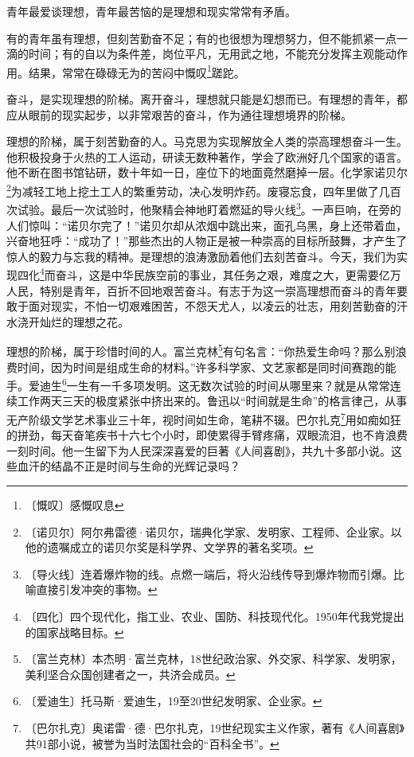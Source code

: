 \documentclass[12pt,UTF-8,openany]{ctexbook}
\begin{document}
\begin{large}
    
    青年最爱谈理想，青年最苦恼的是理想和现实常常有矛盾。
    
    有的青年虽有理想，但刻苦勤奋不足；有的也很想为理想努力，但不能抓紧一点一滴的时间；有的自以为条件差，岗位平凡，无用武之地，不能充分发挥主观能动作用。结果，常常在碌碌无为的苦闷中慨叹\footnote{〔慨叹〕感慨叹息}蹉跎。
    
    奋斗，是实现理想的阶梯。离开奋斗，理想就只能是幻想而已。有理想的青年，都应从眼前的现实起步，以非常艰苦的奋斗，作为通往理想境界的阶梯。
    
    理想的阶梯，属于刻苦勤奋的人。马克思为实现解放全人类的崇高理想奋斗一生。他积极投身于火热的工人运动，研读无数种著作，学会了欧洲好几个国家的语言。他不断在图书馆钻研，数十年如一日，座位下的地面竟然磨掉一层。化学家诺贝尔\footnote{〔诺贝尔〕阿尔弗雷德·诺贝尔，瑞典化学家、发明家、工程师、企业家。以他的遗嘱成立的诺贝尔奖是科学界、文学界的著名奖项。}为减轻工地上挖土工人的繁重劳动，决心发明炸药。废寝忘食，四年里做了几百次试验。最后一次试验时，他聚精会神地盯着燃延的导火线\footnote{〔导火线〕连着爆炸物的线。点燃一端后，将火沿线传导到爆炸物而引爆。比喻直接引发冲突的事物。}。一声巨响，在旁的人们惊叫：“诺贝尔完了！”诺贝尔却从浓烟中跳出来，面孔乌黑，身上还带着血，兴奋地狂呼：“成功了！”那些杰出的人物正是被一种崇高的目标所鼓舞，才产生了惊人的毅力与忘我的精神。是理想的浪涛激励着他们去刻苦奋斗。今天，我们为实现四化\footnote{〔四化〕四个现代化，指工业、农业、国防、科技现代化。1950年代我党提出的国家战略目标。}而奋斗，这是中华民族空前的事业，其任务之艰，难度之大，更需要亿万人民，特别是青年，百折不回地艰苦奋斗。有志于为这一崇高理想而奋斗的青年要敢于面对现实，不怕一切艰难困苦，不怨天尤人，以凌云的壮志，用刻苦勤奋的汗水浇开灿烂的理想之花。
    
    理想的阶梯，属于珍惜时间的人。富兰克林\footnote{〔富兰克林〕本杰明·富兰克林，18世纪政治家、外交家、科学家、发明家，美利坚合众国创建者之一，共济会成员。}有句名言：“你热爱生命吗？那么别浪费时间，因为时间是组成生命的材料。”许多科学家、文艺家都是同时间赛跑的能手。爱迪生\footnote{〔爱迪生〕托马斯·爱迪生，19至20世纪发明家、企业家。}一生有一千多项发明。这无数次试验的时间从哪里来？就是从常常连续工作两天三天的极度紧张中挤出来的。鲁迅以“时间就是生命”的格言律己，从事无产阶级文学艺术事业三十年，视时间如生命，笔耕不辍。巴尔扎克\footnote{〔巴尔扎克〕奥诺雷·德·巴尔扎克，19世纪现实主义作家，著有《人间喜剧》共91部小说，被誉为当时法国社会的“百科全书”。}用如痴如狂的拼劲，每天奋笔疾书十六七个小时，即使累得手臂疼痛，双眼流泪，也不肯浪费一刻时间。他一生留下为人民深深喜爱的巨著《人间喜剧》，共九十多部小说。这些血汗的结晶不正是时间与生命的光辉记录吗？
    

\end{large}
\end{document}
